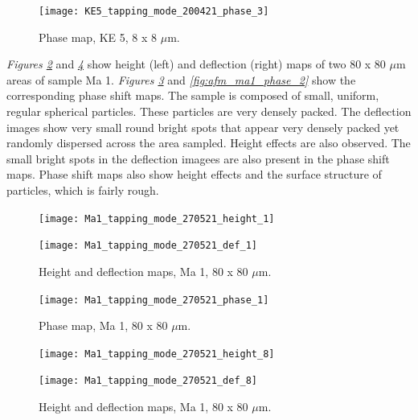 \begin{figure}[H]
\centering
  \texttt{[image: KE5\_tapping\_mode\_200421\_phase\_3]}
\caption[Phase map, KE 5]{Phase map, KE 5, 8 x 8 $\mu$m.}
\label{fig:afm_ke5_phase_3}
\end{figure}



\textit{Figures \ref{fig:afm_ma1_height_def_1}} and \textit{\ref{fig:afm_ma1_height_def_2}} show height (left) and deflection (right) maps of two 80 x 80 $\mu$m areas of sample Ma 1. \textit{Figures \ref{fig:afm_ma1_phase_1}} and \textit{\ref{fig:afm_ma1_phase_2}} show the corresponding phase shift maps. The sample is composed of small, uniform, regular spherical particles. These particles are very densely packed. The deflection images show very small round bright spots that appear very densely packed yet randomly dispersed across the area sampled. Height effects are also observed. The small bright spots in the deflection imagees are also present in the phase shift maps. Phase shift maps also show height effects and the surface structure of particles, which is fairly rough.


\begin{figure}[H]
\centering
\begin{minipage}{.45\textwidth}
  \centering
  \texttt{[image: Ma1\_tapping\_mode\_270521\_height\_1]}
\end{minipage}
\begin{minipage}{.45\textwidth}
  \centering
  \texttt{[image: Ma1\_tapping\_mode\_270521\_def\_1]}
\end{minipage}
\caption[Height and deflection maps, Ma 1]{Height and deflection maps, Ma 1, 80 x 80 $\mu$m.}
\label{fig:afm_ma1_height_def_1}
\end{figure}

\begin{figure}[H]
\centering
  \texttt{[image: Ma1\_tapping\_mode\_270521\_phase\_1]}
\caption[Phase map, Ma 1]{Phase map, Ma 1, 80 x 80 $\mu$m.}
\label{fig:afm_ma1_phase_1}
\end{figure}


\begin{figure}[H]
\centering
\begin{minipage}{.45\textwidth}
  \centering
  \texttt{[image: Ma1\_tapping\_mode\_270521\_height\_8]}
\end{minipage}
\begin{minipage}{.45\textwidth}
  \centering
  \texttt{[image: Ma1\_tapping\_mode\_270521\_def\_8]}
\end{minipage}
\caption[Height and deflection maps, Ma 1]{Height and deflection maps, Ma 1, 80 x 80 $\mu$m.}
\label{fig:afm_ma1_height_def_2}
\end{figure}

